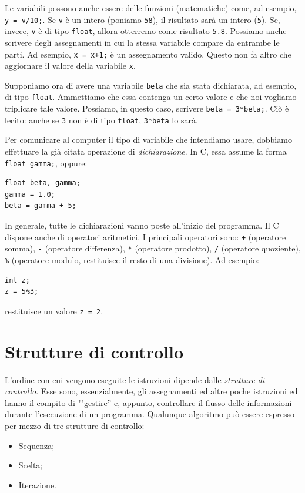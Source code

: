 Le variabili possono anche essere delle funzioni (matematiche) come, ad esempio, \lstinline!y = v/10;!. Se \lstinline!v! è un intero (poniamo \lstinline!58!), il risultato sarà un intero (\lstinline!5!). Se, invece, \lstinline!v! è di tipo \lstinline!float!, allora otterremo come risultato \lstinline!5.8!. Possiamo anche scrivere degli assegnamenti in cui la stessa variabile compare da entrambe le parti. Ad esempio, \lstinline!x = x+1;! è un assegnamento valido. Questo non fa altro che aggiornare il valore della variabile \lstinline!x!.

Supponiamo ora di avere una variabile \lstinline!beta! che sia stata dichiarata, ad esempio, di tipo \lstinline!float!. Ammettiamo che essa contenga un certo valore e che noi vogliamo triplicare tale valore. Possiamo, in questo caso, scrivere \lstinline!beta = 3*beta;!. Ciò è lecito: anche se \lstinline!3! non è di tipo \lstinline!float!, \lstinline!3*beta! lo sarà. 

Per  comunicare al computer il tipo di variabile che intendiamo usare, dobbiamo effettuare la già citata operazione di \emph{dichiarazione}. In C, essa assume la forma \lstinline!float gamma;!, oppure:
\begin{lstlisting}
float beta, gamma;
gamma = 1.0;
beta = gamma + 5;
\end{lstlisting}

In generale, tutte le dichiarazioni vanno poste all'inizio del programma. Il C dispone anche di operatori aritmetici. I  principali operatori sono: \lstinline!+! (operatore somma), \lstinline!-! (operatore differenza), \lstinline!*! (operatore prodotto), \lstinline!/! (operatore quoziente), \lstinline!%! (operatore modulo, restituisce il resto di una divisione). Ad esempio:
\begin{lstlisting}
int z;
z = 5%3;
\end{lstlisting}
restituisce un valore \lstinline!z = 2!.

	\section{Strutture di controllo}
	\label{sec:ContStruc}
L'ordine con cui vengono eseguite le istruzioni dipende dalle \emph{strutture di controllo}. Esse sono, essenzialmente, gli assegnamenti ed altre poche istruzioni ed hanno il compito di ""gestire'' e, appunto, controllare il flusso delle informazioni durante l'esecuzione di un programma. Qualunque algoritmo può essere espresso per mezzo di tre strutture di controllo:
\begin{itemize}
	\item
Sequenza;
	\item
Scelta;
	\item
Iterazione.
\end{itemize}


